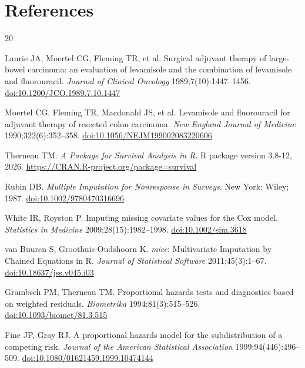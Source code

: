 \section*{References}

\begin{thebibliography}{20}
\small

Laurie JA, Moertel CG, Fleming TR, et al.
Surgical adjuvant therapy of large-bowel carcinoma: an evaluation of
levamisole and the combination of levamisole and fluorouracil.
\emph{Journal of Clinical Oncology} 1989;7(10):1447--1456. \href{https://doi.org/10.1200/JCO.1989.7.10.1447}{doi:10.1200/JCO.1989.7.10.1447}


Moertel CG, Fleming TR, Macdonald JS, et al.
Levamisole and fluorouracil for adjuvant therapy of resected colon
carcinoma.
\emph{New England Journal of Medicine} 1990;322(6):352--358. \href{https://doi.org/10.1056/NEJM199002083220606}{doi:10.1056/NEJM199002083220606}


Therneau TM.
\emph{A Package for Survival Analysis in R}. R package version 3.8-12,
2026. \url{https://CRAN.R-project.org/package=survival}

Rubin DB.
\emph{Multiple Imputation for Nonresponse in Surveys}.
New York: Wiley; 1987. \href{https://doi.org/10.1002/9780470316696}{doi:10.1002/9780470316696}


White IR, Royston P.
Imputing missing covariate values for the Cox model.
\emph{Statistics in Medicine} 2009;28(15):1982--1998. \href{https://doi.org/10.1002/sim.3618}{doi:10.1002/sim.3618}


van Buuren S, Groothuis-Oudshoorn K.
\emph{mice}: Multivariate Imputation by Chained Equations in R.
\emph{Journal of Statistical Software} 2011;45(3):1--67. \href{https://doi.org/10.18637/jss.v045.i03}{doi:10.18637/jss.v045.i03}


Grambsch PM, Therneau TM.
Proportional hazards tests and diagnostics based on weighted residuals.
\emph{Biometrika} 1994;81(3):515--526. \href{https://doi.org/10.1093/biomet/81.3.515}{doi:10.1093/biomet/81.3.515}


Fine JP, Gray RJ.
A proportional hazards model for the subdistribution of a competing risk.
\emph{Journal of the American Statistical Association}
1999;94(446):496--509. \href{https://doi.org/10.1080/01621459.1999.10474144}{doi:10.1080/01621459.1999.10474144}



\end{thebibliography}
